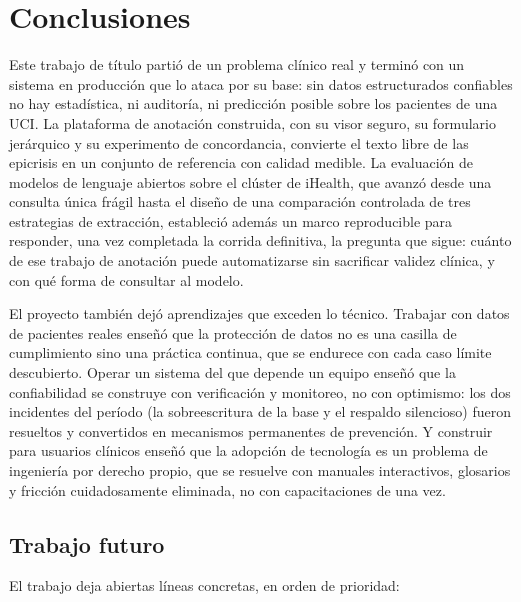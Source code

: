 \documentclass[12pt,letterpaper]{article}
\begin{document}
\section{Conclusiones}

Este trabajo de título partió de un problema clínico real y terminó con un sistema en producción que lo ataca por su base: sin datos estructurados confiables no hay estadística, ni auditoría, ni predicción posible sobre los pacientes de una UCI. La plataforma de anotación construida, con su visor seguro, su formulario jerárquico y su experimento de concordancia, convierte el texto libre de las epicrisis en un conjunto de referencia con calidad medible. La evaluación de modelos de lenguaje abiertos sobre el clúster de iHealth, que avanzó desde una consulta única frágil hasta el diseño de una comparación controlada de tres estrategias de extracción, estableció además un marco reproducible para responder, una vez completada la corrida definitiva, la pregunta que sigue: cuánto de ese trabajo de anotación puede automatizarse sin sacrificar validez clínica, y con qué forma de consultar al modelo.

El proyecto también dejó aprendizajes que exceden lo técnico. Trabajar con datos de pacientes reales enseñó que la protección de datos no es una casilla de cumplimiento sino una práctica continua, que se endurece con cada caso límite descubierto. Operar un sistema del que depende un equipo enseñó que la confiabilidad se construye con verificación y monitoreo, no con optimismo: los dos incidentes del período (la sobreescritura de la base y el respaldo silencioso) fueron resueltos y convertidos en mecanismos permanentes de prevención. Y construir para usuarios clínicos enseñó que la adopción de tecnología es un problema de ingeniería por derecho propio, que se resuelve con manuales interactivos, glosarios y fricción cuidadosamente eliminada, no con capacitaciones de una vez.

\subsection{Trabajo futuro}

El trabajo deja abiertas líneas concretas, en orden de prioridad:
\end{document}
